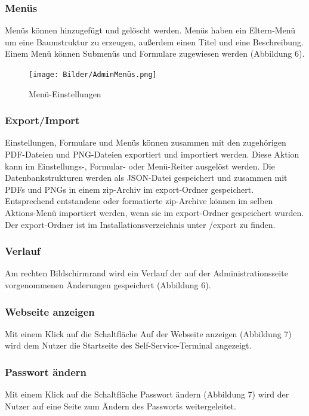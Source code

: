 \newpage

\subsubsection{Menüs} Menüs können hinzugefügt und gelöscht werden. Menüs haben ein Eltern-Menü um eine  Baumstruktur zu erzeugen, außerdem einen Titel und eine Beschreibung. Einem Menü können Submenüs und Formulare zugewiesen werden (Abbildung 6).

\begin{figure}[htp]
    \centering
    \texttt{[image: Bilder/AdminMenüs.png]}
    \caption[Startseite des Self-Service-Terminals]{Menü-Einstellungen}
    \label{fig:SSTAdminMenü}
\end{figure}

\newpage

\subsubsection{Export/Import}Einstellungen, Formulare und Menüs können zusammen mit den zugehörigen PDF-Dateien und PNG-Dateien exportiert und importiert werden. Diese Aktion kann im Einstellungs-, Formular- oder Menü-Reiter ausgelöst werden. Die Datenbankstrukturen werden als JSON-Datei gespeichert und zusammen mit PDFs und PNGs in einem zip-Archiv im export-Ordner gespeichert. Entsprechend entstandene oder formatierte zip-Archive können im selben Aktions-Menü importiert werden, wenn sie im export-Ordner gespeichert wurden. Der export-Ordner ist im Installationsverzeichnis unter /export zu finden.

\subsubsection{Verlauf} Am rechten Bildschirmrand wird ein Verlauf der auf der Administrationsseite vorgenommenen Änderungen gespeichert (Abbildung 6).

\subsubsection{Webseite anzeigen}Mit einem Klick auf die Schaltfläche \glqq Auf der Webseite anzeigen\grqq{} (Abbildung 7) wird dem Nutzer die Startseite des Self-Service-Terminal angezeigt.

\subsubsection{Passwort ändern} Mit einem Klick auf die Schaltfläche \glqq Passwort ändern\grqq{} (Abbildung 7) wird der Nutzer auf eine Seite zum Ändern des Passworts weitergeleitet.

